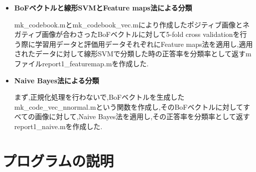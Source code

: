 \documentclass[11pt,a4j]{jreport}
\begin{document}
\begin{itemize}
\item \textbf{BoFベクトルと線形SVMとFeature maps法による分類}

  
  mk\_codebook.mとmk\_codebook\_vec.mにより作成したポジティブ画像とネガティブ画像が合わさったBoFベクトルに対して5-fold cross validationを行う際に学習用データと評価用データそれぞれにFeature maps法を適用し,適用されたデータに対して線形SVMで分類した時の正答率を分類率として返すmファイルreport1\_featuremap.mを作成した.\\
  
\item \textbf{Naive Bayes法による分類}


まず,正規化処理を行わないで,BoFベクトルを生成したmk\_code\_vec\_nnormal.mという関数を作成し,そのBoFベクトルに対してすべての画像に対して,Naive Bayes法を適用し,その正答率を分類率として返すreport1\_naive.mを作成した.
\end{itemize}

\section{プログラムの説明}
\end{document}
